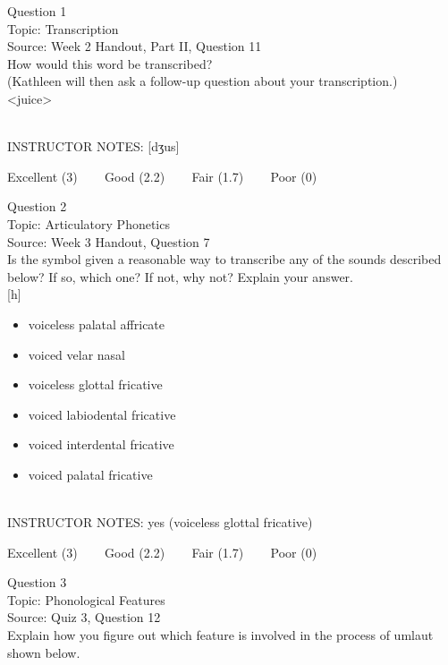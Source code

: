 \documentclass[12pt]{article}
\begin{document}
{\large Question 1}\\

Topic: Transcription\\
Source: Week 2 Handout, Part II, Question 11\\

How would this word be transcribed?\\ (Kathleen will then ask a follow-up question about your transcription.)\\

<juice>


~\\
INSTRUCTOR NOTES: [dʒus]


\vfill
Excellent (3) ~~~ Good (2.2) ~~~ Fair (1.7) ~~~ Poor (0)
\newpage

{\large Question 2}\\

Topic: Articulatory Phonetics\\
Source: Week 3 Handout, Question 7\\

Is the symbol given a reasonable way to transcribe any of the sounds described below? If so, which one? If not, why not? Explain your answer.\\

{[h]}

\begin{itemize} \item voiceless palatal affricate \item voiced velar nasal \item voiceless glottal fricative \item voiced labiodental fricative \item voiced interdental fricative \item voiced palatal fricative \end{itemize}


~\\
INSTRUCTOR NOTES: yes (voiceless glottal fricative)


\vfill
Excellent (3) ~~~ Good (2.2) ~~~ Fair (1.7) ~~~ Poor (0)
\newpage

{\large Question 3}\\

Topic: Phonological Features\\
Source: Quiz 3, Question 12\\

Explain how you figure out which feature is involved in the process of umlaut shown below.\\
\end{document}
